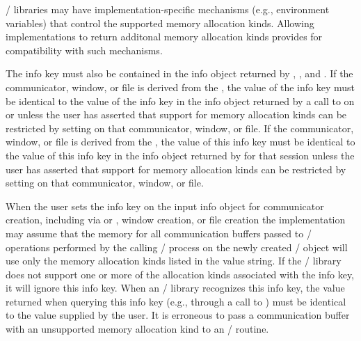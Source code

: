 \begin{rationale}
\MPI/ libraries may have implementation-specific mechanisms (e.g., environment
variables) that control the supported memory allocation kinds. Allowing
implementations to return additonal memory allocation kinds provides for
compatibility with such mechanisms.
\end{rationale}

The  info key must also be contained in the info
object returned by , ,
and .
%
If the communicator, window, or file is derived from the \wpm{}, the value of the 
info key must be identical to the value of the  info key in the info object
returned by a call to  on 
or  unless the user has asserted that support for
memory allocation kinds can be restricted by setting
 on that communicator, window, or file.
%
If the communicator, window, or file is derived from the \spm{}, the value of this
info key must be identical to the value of this info key in the info object
returned by  for that session unless the user
has asserted that support for memory allocation kinds can be restricted by
setting  on that communicator,
window, or file.

When the user sets the  info key on
the input info object for communicator creation, including via
 or , window
creation, or file creation the implementation may assume that the memory for
all communication buffers passed to \MPI/ operations performed by the calling
\MPI/ process on the newly created \MPI/ object will use only the memory
allocation kinds listed in the value string.
%
If the \MPI/ library does not support one or more of the allocation kinds associated
with the  info key, it will ignore
this info key.
%
When an \MPI/ library recognizes this info key, the value returned when
querying this info key (e.g., through a call to )
must be identical to the value supplied by the user.
%
It is erroneous to pass a communication buffer with an unsupported memory allocation kind to
an \MPI/ routine.

